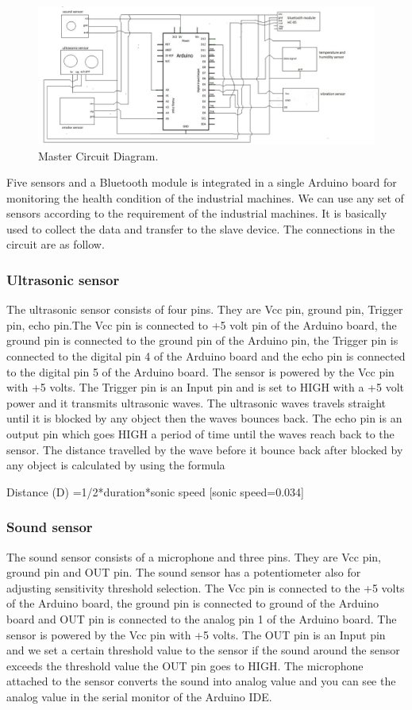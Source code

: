 \begin{figure}[h]
\centerline{\includegraphics[width=5.7in]{MC}}
\caption{ Master Circuit Diagram.}
\end{figure}
Five sensors and a Bluetooth module is integrated in a single Arduino board for monitoring the health condition of the industrial machines. We can use any set of sensors according to the requirement of the industrial machines. It is basically used to collect the data and transfer to the slave device. The connections in the circuit are as follow.
\subsubsection{Ultrasonic sensor}
The ultrasonic sensor consists of four pins. They are Vcc pin, ground pin, Trigger pin, echo pin.The Vcc pin is connected to +5 volt pin of the Arduino board, the ground pin is connected to the ground pin of the Arduino pin, the Trigger pin is connected to the digital pin 4 of the Arduino board and the echo pin is connected to the digital pin 5 of the Arduino board. The sensor is powered by the Vcc pin with +5 volts. The Trigger pin is an Input pin and is set to HIGH with a +5 volt power and it transmits ultrasonic waves. The ultrasonic waves travels straight until it is blocked by any object then the waves bounces back. The echo pin is an output pin which goes HIGH a period of time until the waves reach back to the sensor. The distance travelled by the wave before it bounce back after blocked by any object is calculated by using the formula

 Distance (D) =1/2*duration*sonic speed [sonic speed=0.034]
 
 \subsubsection{Sound sensor}
 The sound sensor consists of a microphone and three pins. They are Vcc pin, ground pin and OUT pin. The sound sensor has a potentiometer also for adjusting sensitivity threshold selection. The Vcc pin is connected to the +5 volts of the Arduino board, the ground pin is connected to ground of the Arduino board and OUT pin is connected to the analog pin 1 of the Arduino board. The sensor is powered by the Vcc pin with +5 volts. The OUT pin is an Input pin and we set a certain threshold value to the sensor if the sound around the sensor exceeds the threshold value the OUT pin goes to HIGH. The microphone attached to the sensor converts the sound into analog value and you can see the analog value in the serial monitor of the Arduino
IDE.
